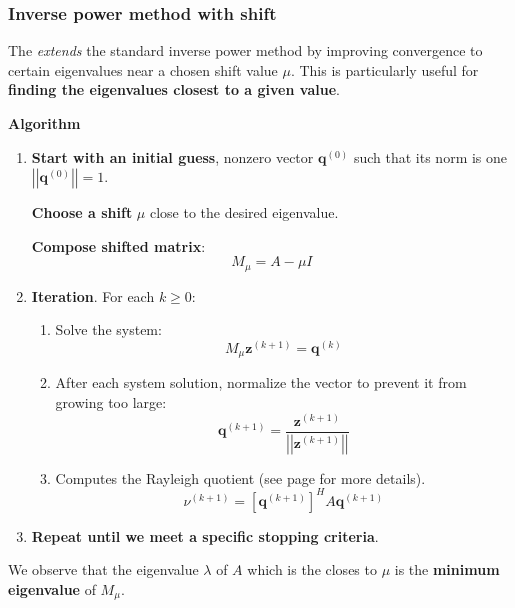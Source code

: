 \subsubsection{Inverse power method with shift}

The  \emph{extends} the standard inverse power method by improving convergence to certain eigenvalues near a chosen shift value $\mu$. This is particularly useful for \textbf{finding the eigenvalues closest to a given value}.

\highspace
\begin{flushleft}
    \textcolor{Green3}{ \textbf{Algorithm}}
\end{flushleft}
\begin{enumerate}
    \item \textbf{Start with an initial guess}, nonzero vector $\mathbf{q}^{\left(0\right)}$ such that its norm is one $\left|\left|\mathbf{q}^{\left(0\right)}\right|\right| = 1$.

    \textbf{Choose a shift} $\mu$ close to the desired eigenvalue.
    
    \textbf{Compose shifted matrix}:
    \begin{equation}
        M_{\mu} = A - \mu I
    \end{equation}

    \item \textbf{Iteration}. For each $k \ge 0$:
    \begin{enumerate}
        \item Solve the system:
        \begin{equation*}
            M_{\mu}\mathbf{z}^{\left(k+1\right)} = \mathbf{q}^{\left(k\right)}
        \end{equation*}

        \item After each system solution, normalize the vector to prevent it from growing too large:
        \begin{equation*}
            \mathbf{q}^{\left(k+1\right)} = \dfrac{
                \mathbf{z}^{\left(k+1\right)}
            }{
                \left|\left|\mathbf{z}^{\left(k+1\right)}\right|\right|
            }
        \end{equation*}

        \item Computes the Rayleigh quotient (see page \pageref{eq: Rayleigh quotient} for more details).
        \begin{equation*}
            \nu^{\left(k+1\right)} = \left[\mathbf{q}^{\left(k+1\right)}\right]^{H} A\mathbf{q}^{\left(k+1\right)}
        \end{equation*}
    \end{enumerate}
    \item \textbf{Repeat until we meet a specific stopping criteria}.
\end{enumerate}
We observe that the eigenvalue $\lambda$ of $A$ which is the closes to $\mu$ is the \textbf{minimum eigenvalue} of $M_{\mu}$.


